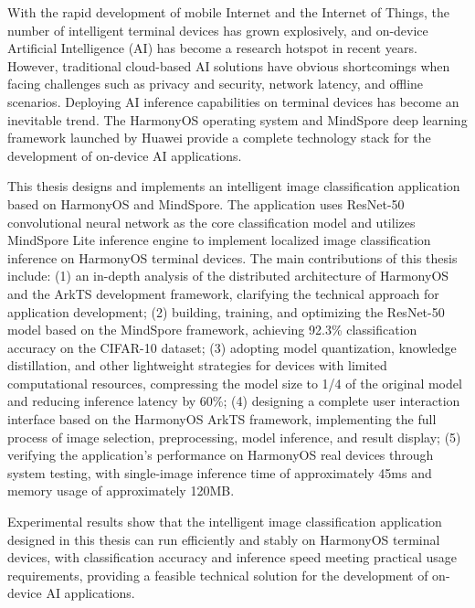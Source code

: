 \begin{enabstract}
	With the rapid development of mobile Internet and the Internet of Things, the number of intelligent terminal devices has grown explosively, and on-device Artificial Intelligence (AI) has become a research hotspot in recent years. However, traditional cloud-based AI solutions have obvious shortcomings when facing challenges such as privacy and security, network latency, and offline scenarios. Deploying AI inference capabilities on terminal devices has become an inevitable trend. The HarmonyOS operating system and MindSpore deep learning framework launched by Huawei provide a complete technology stack for the development of on-device AI applications.

	This thesis designs and implements an intelligent image classification application based on HarmonyOS and MindSpore. The application uses ResNet-50 convolutional neural network as the core classification model and utilizes MindSpore Lite inference engine to implement localized image classification inference on HarmonyOS terminal devices. The main contributions of this thesis include: (1) an in-depth analysis of the distributed architecture of HarmonyOS and the ArkTS development framework, clarifying the technical approach for application development; (2) building, training, and optimizing the ResNet-50 model based on the MindSpore framework, achieving 92.3\% classification accuracy on the CIFAR-10 dataset; (3) adopting model quantization, knowledge distillation, and other lightweight strategies for devices with limited computational resources, compressing the model size to 1/4 of the original model and reducing inference latency by 60\%; (4) designing a complete user interaction interface based on the HarmonyOS ArkTS framework, implementing the full process of image selection, preprocessing, model inference, and result display; (5) verifying the application's performance on HarmonyOS real devices through system testing, with single-image inference time of approximately 45ms and memory usage of approximately 120MB.

	Experimental results show that the intelligent image classification application designed in this thesis can run efficiently and stably on HarmonyOS terminal devices, with classification accuracy and inference speed meeting practical usage requirements, providing a feasible technical solution for the development of on-device AI applications.

\end{enabstract}